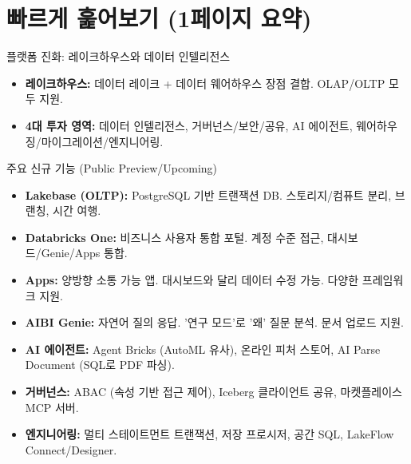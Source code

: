 \documentclass[11pt,a4paper]{article}
\begin{document}
\newpage
\section*{빠르게 훑어보기 (1페이지 요약)}

\begin{tcolorbox}[title=\textbf{Databricks Lecture 14 핵심 요약}, colback=white, colframe=black!20!white, sharp corners, boxrule=0.5mm, breakable]

\begin{summarybox}{플랫폼 진화: 레이크하우스와 데이터 인텔리전스}
\begin{itemize}
    \item \textbf{레이크하우스:} 데이터 레이크 + 데이터 웨어하우스 장점 결합. OLAP/OLTP 모두 지원.
    \item \textbf{4대 투자 영역:} 데이터 인텔리전스, 거버넌스/보안/공유, AI 에이전트, 웨어하우징/마이그레이션/엔지니어링.
\end{itemize}
\end{summarybox}

\begin{summarybox}{주요 신규 기능 (Public Preview/Upcoming)}
\begin{itemize}
    \item \textbf{Lakebase (OLTP):} PostgreSQL 기반 트랜잭션 DB. 스토리지/컴퓨트 분리, 브랜칭, 시간 여행.
    \item \textbf{Databricks One:} 비즈니스 사용자 통합 포털. 계정 수준 접근, 대시보드/Genie/Apps 통합.
    \item \textbf{Apps:} 양방향 소통 가능 앱. 대시보드와 달리 데이터 수정 가능. 다양한 프레임워크 지원.
    \item \textbf{AIBI Genie:} 자연어 질의 응답. '연구 모드'로 '왜' 질문 분석. 문서 업로드 지원.
    \item \textbf{AI 에이전트:} Agent Bricks (AutoML 유사), 온라인 피처 스토어, AI Parse Document (SQL로 PDF 파싱).
    \item \textbf{거버넌스:} ABAC (속성 기반 접근 제어), Iceberg 클라이언트 공유, 마켓플레이스 MCP 서버.
    \item \textbf{엔지니어링:} 멀티 스테이트먼트 트랜잭션, 저장 프로시저, 공간 SQL, LakeFlow Connect/Designer.
\end{itemize}
\end{summarybox}


\end{tcolorbox}
\end{document}
